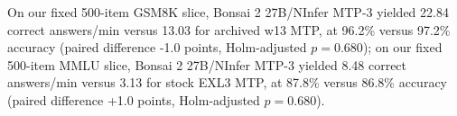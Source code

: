 On our fixed 500-item GSM8K slice, Bonsai 2 27B/NInfer MTP-3 yielded 22.84 correct answers/min versus 13.03 for archived w13 MTP, at 96.2\% versus 97.2\% accuracy (paired difference -1.0 points, Holm-adjusted $p=0.680$); on our fixed 500-item MMLU slice, Bonsai 2 27B/NInfer MTP-3 yielded 8.48 correct answers/min versus 3.13 for stock EXL3 MTP, at 87.8\% versus 86.8\% accuracy (paired difference +1.0 points, Holm-adjusted $p=0.680$).
